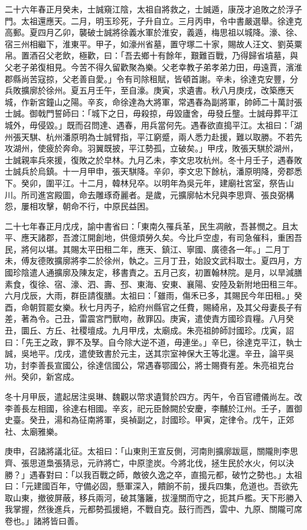 \begin{pinyinscope}
二十六年春正月癸未，士誠窺江陰，太祖自將救之，士誠遁，康茂才追敗之於浮子門。太祖還應天。二月，明玉珍死，子升自立。三月丙申，令中書嚴選舉。徐達克高郵。夏四月乙卯，襲破士誠將徐義水軍於淮安，義遁，梅思祖以城降。濠、徐、宿三州相繼下，淮東平。甲子，如濠州省墓，置守塚二十家，賜故人汪文、劉英粟帛。置酒召父老飲，極歡，曰：「吾去鄉十有餘年，艱難百戰，乃得歸省墳墓，與父老子弟復相見。今苦不得久留歡聚為樂。父老幸教子弟孝弟力田，毋遠賈，濱淮郡縣尚苦寇掠，父老善自愛。」令有司除租賦，皆頓首謝。辛未，徐達克安豐，分兵敗擴廓於徐州。夏五月壬午，至自濠。庚寅，求遺書。秋八月庚戌，改築應天城，作新宮鐘山之陽。辛亥，命徐達為大將軍，常遇春為副將軍，帥師二十萬討張士誠。御戟門誓師曰：「城下之日，毋殺掠，毋毀廬舍，毋發丘壟。士誠母葬平江城外，毋侵毀。」既而召問達、遇春，用兵當何先。遇春欲直搗平江。太祖曰：「湖州張天騏、杭州潘原明為士誠臂指，平江窮蹙，兩人悉力赴援，難以取勝。不若先攻湖州，使疲於奔命。羽翼既披，平江勢孤，立破矣。」甲戌，敗張天騏於湖州，士誠親率兵來援，復敗之於皁林。九月乙未，李文忠攻杭州。冬十月壬子，遇春敗士誠兵於烏鎮。十一月甲申，張天騏降。辛卯，李文忠下餘杭，潘原明降，旁郡悉下。癸卯，圍平江。十二月，韓林兒卒。以明年為吳元年，建廟社宮室，祭告山川。所司進宮殿圖，命去雕琢奇麗者。是歲，元擴廓帖木兒與李思齊、張良弼構怨，屢相攻擊，朝命不行，中原民益困。

二十七年春正月戊戌，諭中書省曰：「東南久罹兵革，民生凋敝，吾甚憫之。且太平、應天諸郡，吾渡江開創地，供億煩勞久矣。今比戶空虛，有司急催科，重困吾民，將何以堪。其賜太平田租二年，應天、鎮江、寧國、廣德各一年。」二月丁未，傅友德敗擴廓將李二於徐州，執之。三月丁丑，始設文武科取士。夏四月，方國珍陰遣人通擴廓及陳友定，移書責之。五月己亥，初置翰林院。是月，以旱減膳素食，復徐、宿、濠、泗、壽、邳、東海、安東、襄陽、安陸及新附地田租三年。六月戊辰，大雨，群臣請復膳。太祖曰：「雖雨，傷禾已多，其賜民今年田租。」癸酉，命朝賀罷女樂。秋七月丙子，給府州縣官之任費，賜綺帛，及其父母妻長子有差，著為令。己丑，雷震宮門獸吻，赦罪囚。庚寅，遣使責方國珍貢糧。八月癸丑，圜丘、方丘、社稷壇成。九月甲戌，太廟成。朱亮祖帥師討國珍。戊寅，詔曰：「先王之政，罪不及孥。自今除大逆不道，毋連坐。」辛巳，徐達克平江，執士誠，吳地平。戊戌，遣使致書於元主，送其宗室神保大王等北還。辛丑，論平吳功，封李善長宣國公，徐達信國公，常遇春鄂國公，將士賜賚有差。朱亮祖克台州。癸卯，新宮成。

冬十月甲辰，遣起居注吳琳、魏觀以幣求遺賢於四方。丙午，令百官禮儀尚左。改李善長左相國，徐達右相國。辛亥，祀元臣餘闕於安慶，李黼於江州。壬子，置御史臺。癸丑，湯和為征南將軍，吳禎副之，討國珍。甲寅，定律令。戊午，正郊社、太廟雅樂。

庚申，召諸將議北征。太祖曰：「山東則王宣反側，河南則擴廓跋扈，關隴則李思齊、張思道梟張猜忌，元祚將亡，中原塗炭。今將北伐，拯生民於水火，何以決勝？」遇春對曰：「以我百戰之師，敵彼久逸之卒，直搗元都，破竹之勢也。」太祖曰：「元建國百年，守備必固，懸軍深入，饋餉不前，援兵四集，危道也。吾欲先取山東，撤彼屏蔽，移兵兩河，破其籓籬，拔潼關而守之，扼其戶檻。天下形勝入我掌握，然後進兵，元都勢孤援絕，不戰自克。鼓行而西，雲中、九原、關隴可席卷也。」諸將皆曰善。


\end{pinyinscope}
